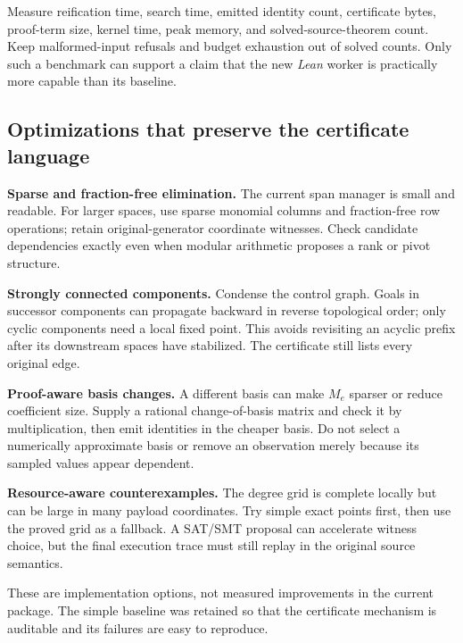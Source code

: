 Measure reification time, search time, emitted identity count, certificate
bytes, proof-term size, kernel time, peak memory, and solved-source-theorem
count. Keep malformed-input refusals and budget exhaustion out of solved
counts. Only such a benchmark can support a claim that the new \emph{Lean}
worker is practically more capable than its baseline.

\subsection{Optimizations that preserve the certificate language}
\textbf{Sparse and fraction-free elimination.} The current span manager is
small and readable. For larger spaces, use sparse monomial columns and
fraction-free row operations; retain original-generator coordinate witnesses.
Check candidate dependencies exactly even when modular arithmetic proposes a
rank or pivot structure.

\textbf{Strongly connected components.} Condense the control graph. Goals in
successor components can propagate backward in reverse topological order;
only cyclic components need a local fixed point. This avoids revisiting an
acyclic prefix after its downstream spaces have stabilized. The certificate
still lists every original edge.

\textbf{Proof-aware basis changes.} A different basis can make $M_e$ sparser or
reduce coefficient size. Supply a rational change-of-basis matrix and check it
by multiplication, then emit identities in the cheaper basis. Do not select a
numerically approximate basis or remove an observation merely because its
sampled values appear dependent.

\textbf{Resource-aware counterexamples.} The degree grid is complete locally
but can be large in many payload coordinates. Try simple exact points first,
then use the proved grid as a fallback. A SAT/SMT proposal can accelerate witness
choice, but the final execution trace must still replay in the original source
semantics.

These are implementation options, not measured improvements in the current
package. The simple baseline was retained so that the certificate mechanism is
auditable and its failures are easy to reproduce.
